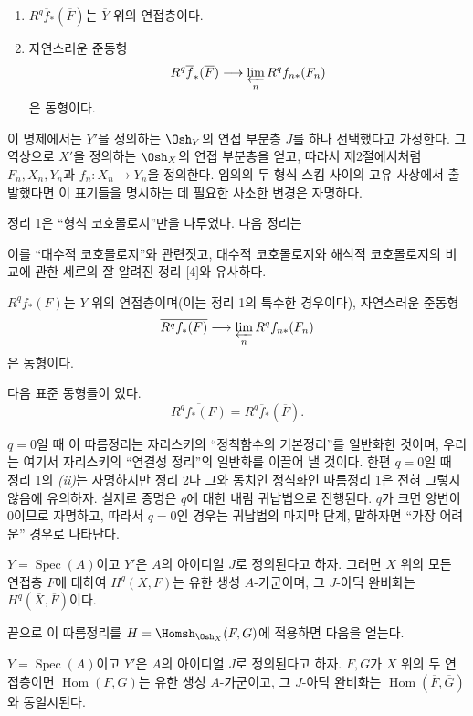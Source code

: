 \begin{enumerate}
  \item[\textit{i.}] $R^{q}\overline f_{*}(\overline F)$는
    $\overline Y$ 위의 연접층이다.
  \item[\textit{ii.}] 자연스러운 준동형
    \[
      R^{q}\overline f_{*}(\overline F)
      \longrightarrow \varprojlim_n R^{q}f_{n*}(F_n)
    \]
    은 동형이다.
\end{enumerate}

이 명제에서는 $Y'$을 정의하는 $\Osh_Y$의 연접 부분층 $J$를 하나
선택했다고 가정한다. 그 역상으로 $X'$을 정의하는 $\Osh_X$의 연접
부분층을 얻고, 따라서 제2절에서처럼 $F_n,X_n,Y_n$과
$f_n:X_n\longrightarrow Y_n$을 정의한다. 임의의 두 형식 스킴 사이의
고유 사상에서 출발했다면 이 표기들을 명시하는 데 필요한 사소한 변경은
자명하다.

정리 1은 ``형식 코호몰로지''만을 다루었다. 다음 정리는

이를 ``대수적 코호몰로지''와 관련짓고, 대수적 코호몰로지와 해석적
코호몰로지의 비교에 관한 세르의 잘 알려진 정리 [4]와 유사하다.

 $R^{q}f_{*}(F)$는 $Y$ 위의
연접층이며(이는 정리 1의 특수한 경우이다), 자연스러운 준동형
\[
  \overline{R^{q}f_{*}(F)}
  \longrightarrow \varprojlim_n R^{q}f_{n*}(F_n)
\]
은 동형이다.

 다음 표준 동형들이 있다.
\[
  \overline{R^{q}f_{*}(F)}=R^{q}\overline f_{*}(\overline F).
\]

$q=0$일 때 이 따름정리는 자리스키의 ``정칙함수의 기본정리''를 일반화한
것이며, 우리는 여기서 자리스키의 ``연결성 정리''의 일반화를 이끌어 낼
것이다. 한편 $q=0$일 때 정리 1의 \textit{(ii)}는 자명하지만 정리 2나
그와 동치인 정식화인 따름정리 1은 전혀 그렇지 않음에 유의하자. 실제로
증명은 $q$에 대한 내림 귀납법으로 진행된다. $q$가 크면 양변이 0이므로
자명하고, 따라서 $q=0$인 경우는 귀납법의 마지막 단계, 말하자면 ``가장
어려운'' 경우로 나타난다.

 $Y=\operatorname{Spec}(A)$이고 $Y'$은 $A$의 아이디얼
$J$로 정의된다고 하자. 그러면 $X$ 위의 모든 연접층 $F$에 대하여
$H^{q}(X,F)$는 유한 생성 $A$-가군이며, 그 $J$-아딕 완비화는
$H^{q}(\overline X,\overline F)$이다.

끝으로 이 따름정리를
$H=\Homsh_{\Osh_X}(F,G)$에 적용하면 다음을 얻는다.

 $Y=\operatorname{Spec}(A)$이고 $Y'$은 $A$의 아이디얼
$J$로 정의된다고 하자. $F,G$가 $X$ 위의 두 연접층이면
$\operatorname{Hom}(F,G)$는 유한 생성 $A$-가군이고, 그 $J$-아딕
완비화는 $\operatorname{Hom}(\overline F,\overline G)$와 동일시된다.

